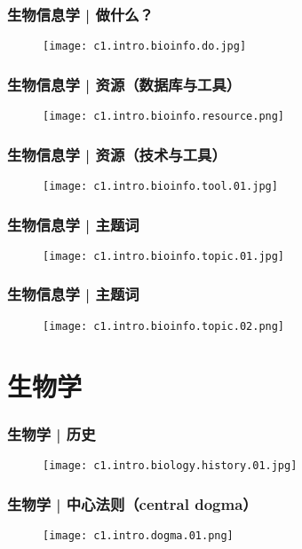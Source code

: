 \begin{frame}
  \frametitle{生物信息学 | \alert{做什么？}}
  \begin{figure}
    \centering
    \texttt{[image: c1.intro.bioinfo.do.jpg]}
  \end{figure}
\end{frame}

\begin{frame}
  \frametitle{生物信息学 | 资源（数据库与工具）}
  \begin{figure}
    \centering
    \texttt{[image: c1.intro.bioinfo.resource.png]}
  \end{figure}
\end{frame}

\begin{frame}
  \frametitle{生物信息学 | 资源（技术与工具）}
  \begin{figure}
    \centering
    \texttt{[image: c1.intro.bioinfo.tool.01.jpg]}
  \end{figure}
\end{frame}

\begin{frame}
  \frametitle{生物信息学 | 主题词}
  \begin{figure}
    \centering
    \texttt{[image: c1.intro.bioinfo.topic.01.jpg]}
  \end{figure}
\end{frame}

\begin{frame}
  \frametitle{生物信息学 | 主题词}
  \begin{figure}
    \centering
    \texttt{[image: c1.intro.bioinfo.topic.02.png]}
  \end{figure}
\end{frame}

\section{生物学}
\begin{frame}
  \frametitle{生物学 | 历史}
  \begin{figure}
    \centering
    \texttt{[image: c1.intro.biology.history.01.jpg]}
  \end{figure}
\end{frame}

\begin{frame}
  \frametitle{生物学 | 中心法则（central dogma）}
  \begin{figure}
    \centering
    \texttt{[image: c1.intro.dogma.01.png]}
  \end{figure}
\end{frame}

